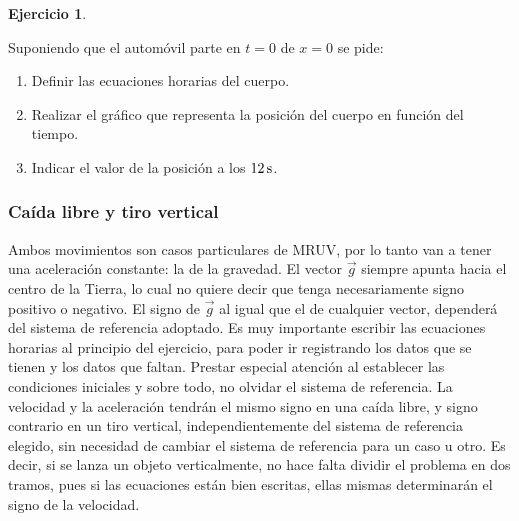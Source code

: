 \documentclass[a4paper,12pt,twoside]{book}
\newtheorem{ejercicio}{{Ejercicio}}[chapter]
\begin{document}
\begin{mdframed}[style=ejercicio-dificil]
    \begin{ejercicio}
    \end{ejercicio}
    \begin{center}
        \def\svgwidth{0.6\linewidth}
        
    \end{center}
    Suponiendo que el automóvil parte en $t=0$ de $x=0$ se pide:
    \begin{enumerate}
        \item Definir las ecuaciones horarias del cuerpo.
        \item Realizar el gráfico que representa la posición del cuerpo en función del tiempo.
        \item Indicar el valor de la posición a los $12\,\si{\second}$.
    \end{enumerate}
\end{mdframed}

    
\subsubsection{Caída libre y tiro vertical}

\begin{mdframed}[style=explicacion]
    Ambos movimientos son casos particulares de MRUV, por lo tanto van a tener una aceleración constante: la de la gravedad. El vector $\Vec{g}$ siempre apunta hacia el centro de la Tierra, lo cual no quiere decir que tenga necesariamente signo positivo o negativo. El signo de $\Vec{g}$ al igual que el de cualquier vector, dependerá del sistema de referencia adoptado. Es muy importante escribir las ecuaciones horarias al principio del ejercicio, para poder ir registrando los datos que se tienen y los datos que faltan. Prestar especial atención al establecer las condiciones iniciales y sobre todo, no olvidar el sistema de referencia.
    La velocidad y la aceleración tendrán el mismo signo en una caída libre, y signo contrario en un tiro vertical, independientemente del sistema de referencia elegido, sin necesidad de cambiar el sistema de referencia para un caso u otro. Es decir, si se lanza un objeto verticalmente, no hace falta dividir el problema en dos tramos, pues si las ecuaciones están bien escritas, ellas mismas determinarán el signo de la velocidad. 
\end{mdframed}
\end{document}
